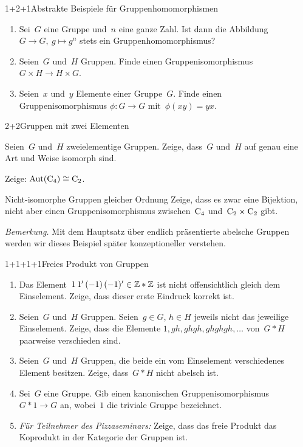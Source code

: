\documentclass{algblatt}
\begin{document}

\begin{aufgabe}{1+2+1}{Abstrakte Beispiele für Gruppenhomomorphismen}
\begin{enumerate}
\item Sei~$G$ eine Gruppe und~$n$ eine ganze Zahl. Ist dann die
Abbildung
$G \to G,\ g \mapsto g^n$ stets ein Gruppenhomomorphismus?
\item Seien~$G$ und~$H$ Gruppen. Finde einen Gruppenisomorphismus~$G \times H \to H \times G$.
\item Seien~$x$ und~$y$ Elemente einer Gruppe~$G$. Finde einen
Gruppenisomorphismus \linebreak
$\phi : G \to G$ mit~$\phi(xy) = yx$.
\end{enumerate}
\end{aufgabe}

\begin{aufgabeE}{2+2}{Gruppen mit zwei Elementen}
\item Seien~$G$ und~$H$ zweielementige Gruppen. Zeige, dass~$G$ und~$H$ auf
genau eine Art und Weise isomorph sind.
\item Zeige: $\mathrm{Aut}(\mathrm{C}_4) \cong \mathrm{C}_2$.
\end{aufgabeE}

\begin{aufgabe}{4}{Nicht-isomorphe Gruppen gleicher Ordnung}
Zeige, dass es zwar eine Bijektion, nicht aber einen Gruppenisomorphismus
zwischen~$\mathrm{C}_4$ und~$\mathrm{C}_2 \times \mathrm{C}_2$ gibt.

\emph{Bemerkung.} Mit dem Hauptsatz über endlich präsentierte abelsche Gruppen
werden wir dieses Beispiel später konzeptioneller verstehen.
\end{aufgabe}

\begin{aufgabe}{1+1+1+1}{Freies Produkt von Gruppen}
\begin{enumerate}
\item Das Element~$1\,1'\,(-1)\,(-1)' \in \mathbb{Z} * \mathbb{Z}$ ist nicht offensichtlich
gleich dem Einselement. Zeige, dass dieser erste Eindruck korrekt ist.
\item Seien~$G$ und~$H$ Gruppen. Seien~$g \in G$, $h \in H$ jeweils nicht das
jeweilige Einselement. Zeige, dass die Elemente
$1, gh, ghgh, ghghgh, \ldots$ von~$G * H$ paarweise verschieden sind.
\item Seien~$G$ und~$H$ Gruppen, die beide ein vom Einselement verschiedenes
Element besitzen. Zeige, dass~$G * H$ nicht abelsch ist.
\item Sei~$G$ eine Gruppe. Gib einen kanonischen Gruppenisomorphismus~$G * 1 \to G$ an,
wobei~$1$ die triviale Gruppe bezeichnet.

\tiny
\item \emph{Für Teilnehmer des Pizzaseminars:} Zeige, dass das freie
Produkt das Koprodukt in der Kategorie der Gruppen ist.
\end{enumerate}
\end{aufgabe}
\end{document}
